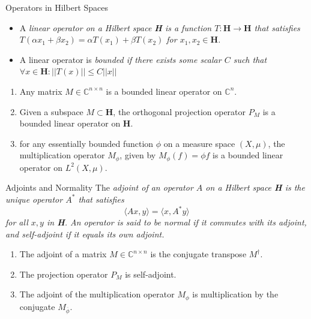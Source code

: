 \documentclass{beamer}
\begin{document}
\begin{frame}{Operators in Hilbert Spaces}
    \begin{itemize}
        \item A \em linear operator \em on a Hilbert space \textbf{H} is a function $T:
        \textbf{H} \to \textbf{H}$ that satisfies
        $T(\alpha x_1 + \beta x_2) = \alpha T(x_1) + \beta T(x_2)$ for $x_1, x_2 \in
        \textbf{H}$.

        \item A linear operator is \em bounded \em if there exists some scalar $C$ such
        that $\forall x\in \textbf{H}: ||T(x)||\leq C||x||$
    \end{itemize}
    \begin{example}
        \begin{enumerate}
            \item Any matrix $M\in \mathbb{C}^{n\times n}$ is a bounded linear
                operator on $\mathbb{C}^n$.
            \item Given a subspace $M \subset \textbf{H}$, the orthogonal
                projection operator $P_M$ is a bounded linear operator on
                \textbf{H}.
            \item for any essentially bounded function $\phi$ on a measure space
                $(X,\mu)$, the multiplication operator $M_{\phi}$, given by
                $M_{\phi}(f)=\phi f$ is a bounded linear operator on
                $L^2(X,\mu)$.
        \end{enumerate}
    \end{example}
\end{frame}

\begin{frame}{Adjoints and Normality}
    The \em adjoint \em of an operator $A$ on a Hilbert space \textbf{H} is the
    unique operator $A^*$ that satisfies
    \[
        \langle Ax, y \rangle = \langle x, A^*y \rangle
    \]
    for all $x,y$ in \textbf{H}.
    An operator is said to be \em normal \em if it commutes with its adjoint,
    and \em self-adjoint \em if it equals its own adjoint.

    \begin{example}
        \begin{enumerate}
            \item The adjoint of a matrix $M\in \mathbb{C}^{n\times n}$ is the
                conjugate transpose $M^{\dagger}$.
            \item The projection operator $P_M$ is self-adjoint.
            \item The adjoint of the multiplication operator $M_{\phi}$ is
                multiplication by the conjugate $M_{\overline{\phi}}$.
        \end{enumerate}
    \end{example}
\end{frame}
\end{document}
